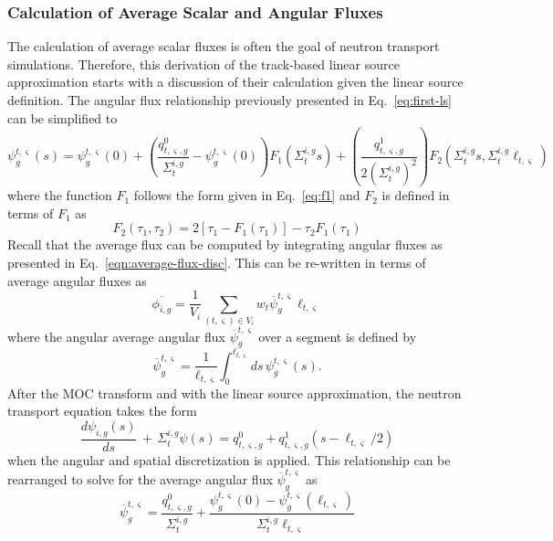 \subsubsection{Calculation of Average Scalar and Angular Fluxes}

The calculation of average scalar fluxes is often the goal of neutron transport simulations. Therefore, this derivation of the track-based linear source approximation starts with a discussion of their calculation given the linear source definition. The angular flux relationship previously presented in Eq.~\ref{eq:first-ls} can be simplified to
\begin{equation}
\psi_g^{t,\varsigma}(s) = \psi^{t,\varsigma}_g(0) + \left( \frac{q^0_{t,\varsigma,g}}{\Sigma_{t}^{i,g}} - \psi_g^{t,\varsigma}(0) \right) F_1\left(\Sigma_{t}^{i,g} s \right) + \left(\frac{q^1_{t,\varsigma,g}}{2\left(\Sigma_{t}^{i,g}\right)^2}\right) F_2\left(\Sigma_{t}^{i,g} s, \Sigma_{t}^{i,g} \ell_{t,\varsigma} \right)
\label{eq:ls-angular-flux}
\end{equation}
where the function $F_1$ follows the form given in Eq.~\ref{eq:f1} and $F_2$ is defined in terms of $F_1$ as
\begin{equation}
F_2(\tau_1, \tau_2) = 2 \left[\tau_1 - F_1(\tau_1)\right] - \tau_2 F_1(\tau_1)
\label{eq:f2}
\end{equation}
Recall that the average flux can be computed by integrating angular fluxes as presented in Eq.~\ref{eqn:average-flux-disc}. This can be re-written in terms of average angular fluxes as
\begin{equation}
\overline{\phi_{i,g}} = \frac{1}{V_i} \sum_{(t,\varsigma) \in V_i} w_t \overline{\psi}^{t,\varsigma}_g \ell_{t,\varsigma}
\label{eq:flat-scalar-flux}
\end{equation}
where the angular average angular flux $\overline{\psi}^{t,\varsigma}_g$ over a segment is defined by
\begin{equation}
\overline{\psi}^{t,\varsigma}_g = \frac{1}{\ell_{t,\varsigma}}\int_{0}^{\ell_{t,\varsigma}} ds \, \psi^{t,\varsigma}_g(s).
\end{equation}
After the MOC transform and with the linear source approximation, the neutron transport equation takes the form
\begin{equation}
\frac{d\psi_{i,g}(s)}{ds} \, + \, \Sigma_{t}^{i,g} \psi(s) = q^0_{t,\varsigma,g} + q^1_{t,\varsigma,g}(s-\ell_{t,\varsigma}/2)
\end{equation}
when the angular and spatial discretization is applied. This relationship can be rearranged to solve for the average angular flux $\overline{\psi}^{t,\varsigma}_g$ as
\begin{equation}
\overline{\psi}^{t,\varsigma}_g = \frac{q^0_{t,\varsigma,g}}{\Sigma_{t}^{i,g}} + \frac{\psi^{t,\varsigma}_g(0) - \psi^{t,\varsigma}_g(\ell_{t,\varsigma})}{\Sigma_{t}^{i,g} \ell_{t,\varsigma}}
\label{eq:ls-avg-angular-flux}
\end{equation}

